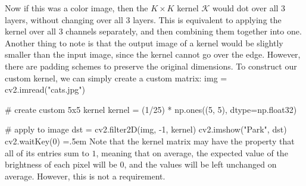 \documentclass{article}
\newenvironment{cverbatim}
 {\SaveVerbatim{cverb}}
 {\endSaveVerbatim
  \flushleft\fboxrule=0pt\fboxsep=.5em
  \colorbox{cverbbg}{%
    \makebox[\dimexpr\linewidth-2\fboxsep][l]{\BUseVerbatim{cverb}}%
  }
  \endflushleft
}
\theoremstyle{definition}
\theoremstyle{remark}
\theoremstyle{definition}
\begin{document}
Now if this was a color image, then the $K \times K$ kernel $\mathcal{K}$ would dot over all 3 layers, without changing over all 3 layers. This is equivalent to applying the kernel over all 3 channels separately, and then combining them together into one. Another thing to note is that the output image of a kernel would be slightly smaller than the input image, since the kernel cannot go over the edge. However, there are padding schemes to preserve the original dimensions. To construct our custom kernel, we can simply create a custom matrix: 
\begin{cverbatim}
img = cv2.imread("cats.jpg")

# create custom 5x5 kernel
kernel = (1/25) * np.ones((5, 5), dtype=np.float32)

# apply to image
dst = cv2.filter2D(img, -1, kernel)
cv2.imshow("Park", dst)
cv2.waitKey(0)
\end{cverbatim}
Note that the kernel matrix may have the property that all of its entries sum to $1$, meaning that on average, the expected value of the brightness of each pixel will be $0$, and the values will be left unchanged on average. However, this is not a requirement. 
\end{document}
